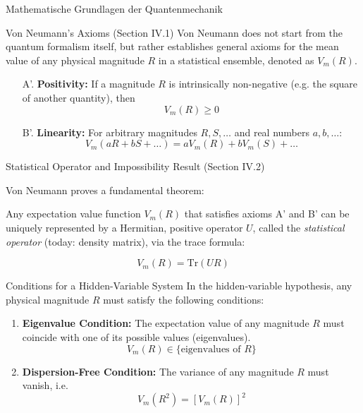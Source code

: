\begin{frame}{Mathematische Grundlagen der Quantenmechanik}
\begin{minipage}{0.44\textwidth}
  \end{minipage}
\end{frame}

\begin{frame}{Von Neumann's Axioms (Section IV.1)}
  Von Neumann does not start from the quantum formalism itself,
  but rather establishes general axioms for the mean value of any
  physical magnitude $R$ in a statistical ensemble, denoted as $V_m(R)$.

  \pause
  \begin{itemize}
    \item[A'.] \textbf{Positivity:}
    If a magnitude $R$ is intrinsically non-negative (e.g. the square of another quantity), then
    \[
    V_m(R) \geq 0
    \]

    \pause
    \item[B'.] \textbf{Linearity:}
    For arbitrary magnitudes $R, S, \dots$ and real numbers $a, b, \dots$:
    \[
    V_m(aR + bS + \dots) = aV_m(R) + bV_m(S) + \dots
    \]
  \end{itemize}
\end{frame}

\begin{frame}{Statistical Operator and Impossibility Result (Section IV.2)}

  Von Neumann proves a fundamental theorem:

  \pause
  Any expectation value function $V_m(R)$ that satisfies axioms A' and B'
  can be uniquely represented by a Hermitian, positive operator $U$,
  called the \textit{statistical operator} (today: density matrix), via the trace formula:

  \pause
  \[
    V_m(R) = \mathrm{Tr}(UR)
  \]
\end{frame}

\begin{frame}{Conditions for a Hidden-Variable System}
  In the hidden-variable hypothesis, any physical magnitude $R$
  must satisfy the following conditions:

  \pause
  \begin{enumerate}
    \item \textbf{Eigenvalue Condition:}
    The expectation value of any magnitude $R$ must coincide with one of its possible values (eigenvalues).
    \[
      V_m(R) \in \{\text{eigenvalues of } R\}
    \]

    \pause
    \item \textbf{Dispersion-Free Condition:}
    The variance of any magnitude $R$ must vanish, i.e.
    \[
      V_m(R^2) = [V_m(R)]^2
    \]
  \end{enumerate}
\end{frame}

